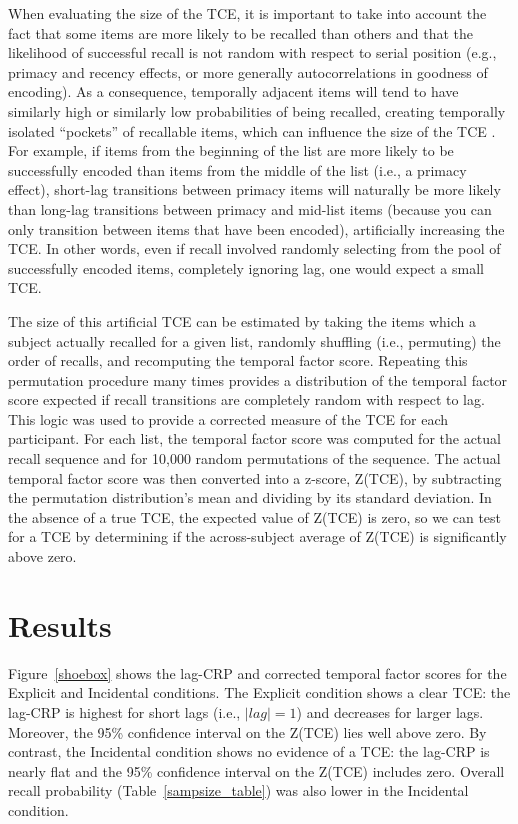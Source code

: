 \documentclass[jou,natbib,floatsintext]{apa6} %
\begin{document}
When evaluating the size of the TCE, it is important to take into account the fact that some items are more likely to be recalled than others and that the likelihood of successful recall is not random with respect to serial position (e.g., primacy and recency effects, or more generally autocorrelations in goodness of encoding). As a consequence, temporally adjacent items will tend to have similarly high or similarly low probabilities of being recalled, creating temporally isolated ``pockets'' of recallable items, which can influence the size of the TCE \citep{Hint16,SedeEtal10}. For example, if items from the beginning of the list are more likely to be successfully encoded than items from the middle of the list (i.e., a primacy effect), short-lag transitions between primacy items will naturally be more likely than long-lag transitions between primacy and mid-list items (because you can only transition between items that have been encoded), artificially increasing the TCE. In other words, even if recall involved randomly selecting from the pool of successfully encoded items, completely ignoring lag, one would expect a small TCE.

The size of this artificial TCE can be estimated by taking the items which a subject actually recalled for a given list, randomly shuffling (i.e., permuting) the order of recalls, and recomputing the temporal factor score. Repeating this permutation procedure many times provides a distribution of the temporal factor score expected if recall transitions are completely random with respect to lag. This logic was used to provide a corrected measure of the TCE for each participant. For each list, the temporal factor score was computed for the actual recall sequence and for 10,000 random permutations of the sequence.
The actual temporal factor score was then converted into a z-score, Z(TCE), by subtracting the permutation distribution's mean and dividing by its standard deviation. In the absence of a true TCE, the expected value of Z(TCE) is zero, so we can test for a TCE by determining if the across-subject average of Z(TCE) is significantly above zero.



\section{Results}

Figure~\ref{shoebox} shows the lag-CRP and corrected temporal factor scores for the Explicit and Incidental conditions. The Explicit condition shows a clear TCE: the lag-CRP is highest for short lags (i.e., $|lag|=1$) and decreases for larger lags. Moreover, the 95\% confidence interval on the Z(TCE) lies well above zero. By contrast, the Incidental condition shows no evidence of a TCE: the lag-CRP is nearly flat and the 95\% confidence interval on the Z(TCE) includes zero. Overall recall probability (Table~\ref{sampsize_table}) was also lower in the Incidental condition.
\end{document}
